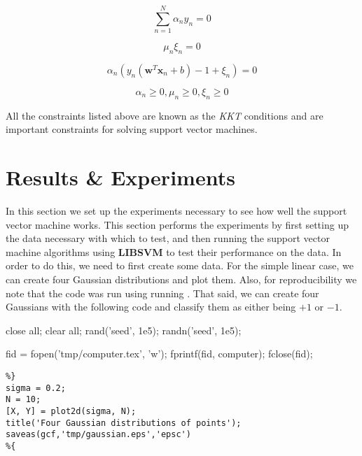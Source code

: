 \documentclass[11pt, twoside]{article}   	%
\newenvironment{matlab}{\comment}{\endcomment}
\begin{document}
\begin{equation}
\sum\limits_{n=1}^{N} \alpha_n y_n = 0
\label{eq:c3}
\end{equation}

\begin{equation}
\mu_n \xi_n = 0
\label{eq:c4}
\end{equation}

\begin{equation}
\alpha_n(y_n(\mathbf{w}^T\mathbf{x}_n + b) - 1 + \xi_n) = 0
\label{eq:c5}
\end{equation}

\begin{equation}
\alpha_n \geq 0, \mu_n \geq 0, \xi_n \geq 0
\label{eq:c6}
\end{equation}

All the constraints listed above are known as the \textit{KKT} conditions and are important
constraints for solving support vector machines. 

\section{Results \& Experiments}
 In this section we set up the experiments necessary to see how well
 the support vector machine works. This section performs the experiments
 by first setting up the data necessary with which to test, and then 
 running the support vector machine algorithms using \textbf{LIBSVM}
  to test their performance on the data. In order to do this, 
we need to first create some data. For the simple linear case, we can create
four Gaussian distributions and plot them. Also, for reproducibility 
we note that the code was run using  running
  . That said, we can create four Gaussians
with the following code and classify them as either being $+1$ or $-1$. 

\begin{matlab}
close all; 
clear all;
rand('seed', 1e5);
randn('seed', 1e5);

fid = fopen('tmp/computer.tex', 'w'); 
fprintf(fid, computer); 
fclose(fid); 
\end{matlab}

\begin{lstlisting}
%}
sigma = 0.2; 
N = 10; 
[X, Y] = plot2d(sigma, N);
title('Four Gaussian distributions of points'); 
saveas(gcf,'tmp/gaussian.eps','epsc')
%{
\end{lstlisting}  
\end{document}
